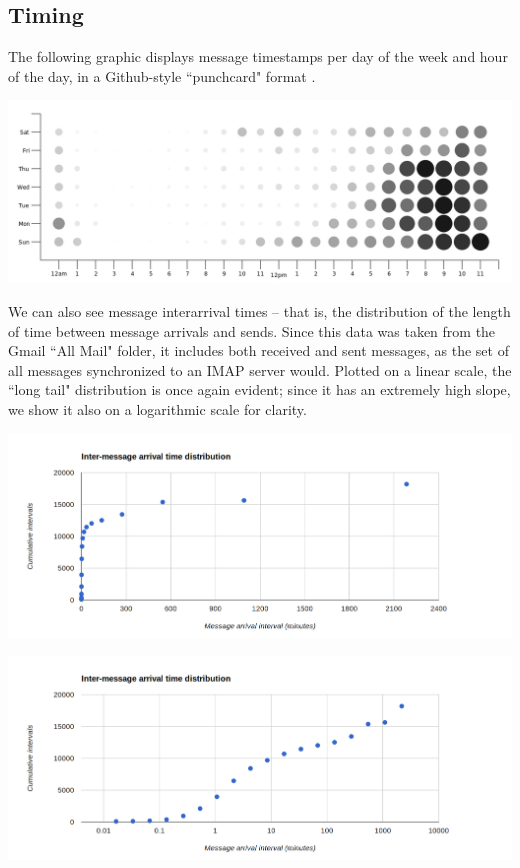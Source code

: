 \documentclass[pageno]{jpaper}
\begin{document}
\subsection{Timing}

The following graphic displays message timestamps per day of the week and hour of the day, in a Github-style ``punchcard" format \cite{punchcard}.

\includegraphics[width=\textwidth]{punchcard}

We can also see message interarrival times \--- that is, the distribution of the length of time between message arrivals and sends. Since this data was taken from the Gmail ``All Mail" folder, it includes both received and sent messages, as the set of all messages synchronized to an IMAP server would. Plotted on a linear scale, the ``long tail" distribution is once again evident; since it has an extremely high slope, we show it also on a logarithmic scale for clarity.

\includegraphics[width=\textwidth]{intermessagelinear}

\includegraphics[width=\textwidth]{intermessagelog}
\end{document}
